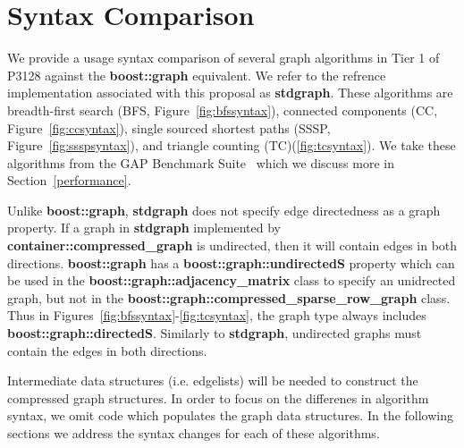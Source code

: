 
\clearpage

\section{Syntax Comparison} \label{syntax}
We provide a usage syntax comparison of several graph algorithms
in Tier 1 of P3128 against the \textbf{boost::graph} equivalent.
We refer to the refrence implementation associated with this proposal
as \textbf{stdgraph}.
These algorithms are breadth-first search (BFS, Figure~\ref{fig:bfssyntax}),
connected components (CC, Figure~\ref{fig:ccsyntax}),
single sourced shortest paths (SSSP, Figure~\ref{fig:ssspsyntax}),
and triangle counting (TC)(\ref{fig:tcsyntax}).
We take these algorithms from the GAP Benchmark Suite~\cite{gapbs_2023}
which we discuss more in Section~\ref{performance}.

Unlike \textbf{boost::graph}, \textbf{stdgraph} does not specify edge directedness
as a graph property.
If a graph in \textbf{stdgraph} implemented by \textbf{container::compressed\_graph}
is undirected, then it will contain edges in both directions.
\textbf{boost::graph} has a \textbf{boost::graph::undirectedS} property
which can be used in the \textbf{boost::graph::adjacency\_matrix} class
to specify an unidrected graph, but
not in the \textbf{boost::graph::compressed\_sparse\_row\_graph} class.
Thus in Figures~\ref{fig:bfssyntax}-\ref{fig:tcsyntax}, the graph type always includes \textbf{boost::graph::directedS}.
Similarly to \textbf{stdgraph}, undirected graphs must contain the edges in both directions.

Intermediate data structures (i.e. edgelists) will be needed
to construct the compressed graph structures.
In order to focus on the differenes in algorithm syntax, we omit
code which populates the graph data structures.
In the following sections we address the syntax changes for each of
these algorithms.

